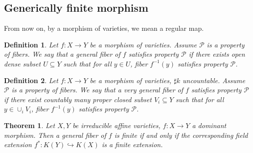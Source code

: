 \documentclass{ctexart}
\newtheorem{definition}{Definition}[section]
\newtheorem{theorem}{Theorem}[section]
\begin{document}
\subsection{Generically finite morphism}
\label{subsection:Dimension_Theory_Generically_finite_morphism}

From now on, by a morphism of varieties, we mean a regular map.
\begin{definition}
    Let $f: X \rightarrow Y$ be a morphism of varieties.
    Assume $\mathcal{P}$ is a property of fibers.
    We say that a general fiber of $f$ satisfies property $\mathcal{P}$ if there exists open dense subset $U \subseteq Y$ such that for all $y\in U$,
    fiber $f^{-1}(y)$ satisfies property $\mathcal{P}$.
\end{definition}
\begin{definition}
    Let $f: X \rightarrow Y$ be a morphism of varieties, $\sharp k$ uncountable.
    Assume $\mathcal{P}$ is a property of fibers.
    We say that a very general fiber of $f$ satisfies property $\mathcal{P}$ if there exist countably many proper closed subset $V_{i} \subseteq Y$ such that for all $y\in \cup_{i} V_{i}$,
    fiber $f^{-1}(y)$ satisfies property $\mathcal{P}$.
\end{definition}
\begin{theorem}
    Let $X, Y$ be irreducible affine varieties, $f: X \rightarrow Y$ a dominant morphism.
    Then a general fiber of $f$ is finite if and only if the corresponding field extension $f^{\ast}: K(Y) \hookrightarrow K(X)$ is a finite extension.
    \label{Theorem 4.5}
\end{theorem}
\end{document}
